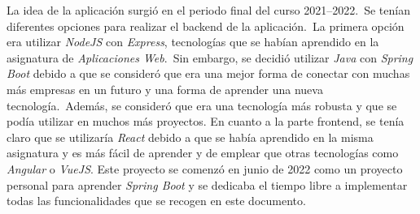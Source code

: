 La idea de la aplicación surgió en el periodo final del curso 2021--2022.\ Se tenían diferentes opciones para realizar
el backend de la aplicación.\ La primera opción era utilizar \textit{NodeJS} con \textit{Express},
tecnologías que se habían aprendido en la asignatura de \textit{Aplicaciones Web}.\ Sin embargo, se decidió utilizar
\textit{Java} con \textit{Spring Boot} debido a que se consideró que era una mejor forma de conectar con muchas más
empresas en un futuro y una forma de aprender una nueva tecnología.\ Además, se consideró que era una tecnología más
robusta y que se podía utilizar en muchos más proyectos.
En cuanto a la parte frontend, se tenía claro que se utilizaría \textit{React} debido a que se había aprendido en la
misma asignatura y es más fácil de aprender y de emplear que otras tecnologías como \textit{Angular} o \textit{VueJS}.
Este proyecto se comenzó en junio de 2022 como un proyecto personal para aprender \textit{Spring Boot} y
se dedicaba el tiempo libre a implementar todas las funcionalidades que se recogen en este documento.

